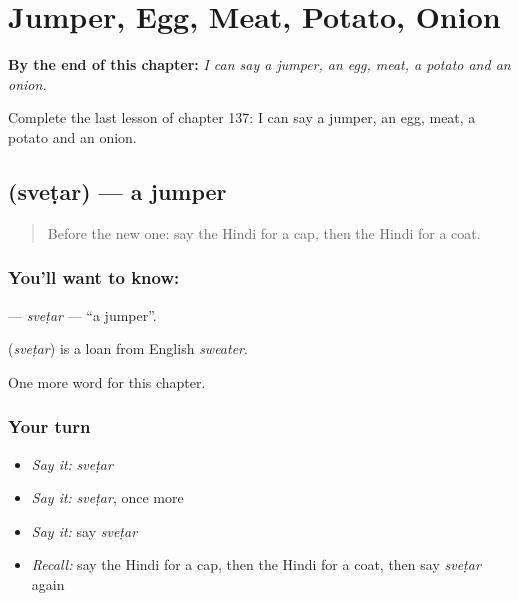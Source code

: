 
\chapter{Jumper, Egg, Meat, Potato, Onion}
\label{ch:hi-jumper-egg-meat-potato-onion}

\begin{chapteropening}
\textbf{By the end of this chapter:} \emph{I can say a jumper, an egg, meat, a potato and an onion.}

Complete the last lesson of chapter 137: I can say a jumper, an egg, meat, a potato and an onion.
\end{chapteropening}

\section[\texorpdfstring{\hi{स्वेटर} (sveṭar)}{स्वेटर (sveṭar)}]{ (sveṭar) — a jumper}

\label{lesson:HI-C137-svetar}



\begin{quote}
Before the new one: say the Hindi for a cap, then the Hindi for a coat.
\end{quote}

\subsection*{You'll want to know: }
\textbf{} — \emph{sveṭar} — \textquotedblleft{}a jumper\textquotedblright{}.

\begin{cousinweb}
\textbf{} (\emph{sveṭar}) is a loan from English \emph{sweater}.
\end{cousinweb}

\begin{grammarlens}[title={What you've built}]
One more word for this chapter.
\end{grammarlens}

\subsection*{Your turn}
\begin{itemize}
\raggedright
  \item \emph{Say it:} \emph{sveṭar}
  \item \emph{Say it:} \emph{sveṭar}, once more
  \item \emph{Say it:} say \emph{sveṭar}
  \item \emph{Recall:} say the Hindi for a cap, then the Hindi for a coat, then say \emph{sveṭar} again
\end{itemize}

